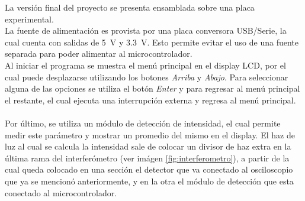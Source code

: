 La versión final del proyecto se presenta ensamblada sobre una placa experimental.\\
La fuente de alimentación es provista por una placa conversora USB/Serie, la cual cuenta con salidas de \SI{5}{\volt} y \SI{3.3}{\volt}. Esto permite evitar el uso de una fuente separada para poder alimentar al microcontrolador.\\

Al iniciar el programa se muestra el menú principal en el display LCD, por el cual puede desplazarse utilizando los botones \textit{Arriba} y \textit{Abajo}. Para  seleccionar alguna de las opciones se utiliza el botón \textit{Enter} y para regresar al menú principal el restante, el cual ejecuta una interrupción externa y regresa al menú principal.\\
\\

Por último, se utiliza un módulo de detección de intensidad, el cual permite medir este parámetro y mostrar un promedio del mismo en el display. El haz de luz al cual se calcula la intensidad sale de colocar un divisor de haz extra en la última rama del interferómetro (ver imágen \ref{fig:interferometro}), a partir de la cual queda colocado en una sección el detector que va conectado al osciloscopio que ya se mencionó anteriormente, y en la otra el módulo de detección que esta conectado al microcontrolador.